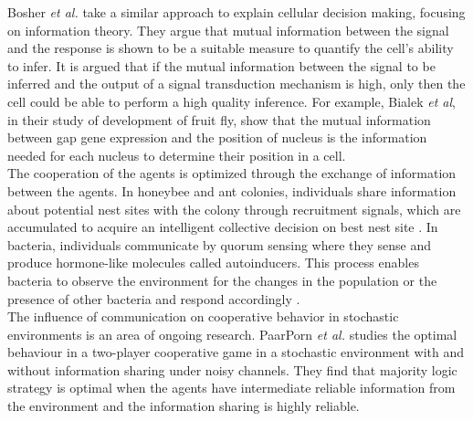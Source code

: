 Bosher \textit{et al.} \cite{Bowsher2014} take a similar approach to explain cellular decision making, focusing on information theory. They argue that mutual information between the signal and the response is shown to be a suitable measure to quantify the cell's ability to infer. It is argued that if the mutual information between the signal to be inferred and the output of a signal transduction mechanism is high, only then the cell could be able to perform a high quality inference. For example, Bialek \textit{et al}, in their study of development of fruit fly, show that the mutual information between gap gene expression and the position of nucleus is the information needed for each nucleus to determine their position in a cell. \\
The cooperation of the agents is optimized through the exchange of information between the agents. In honeybee and ant colonies, individuals share information about potential nest sites with the colony through recruitment signals, which are accumulated to acquire an intelligent collective decision on best nest site \cite{Franks2002}. In bacteria, individuals communicate by quorum sensing where they sense and produce hormone-like molecules called autoinducers. This process enables bacteria to observe the environment for the changes in the population or the presence of other bacteria and respond accordingly \cite{waters2005quorum}.\\
The influence of communication on cooperative behavior in stochastic environments is an area of ongoing research. PaarPorn \textit{et al.} \cite{Paarporn2018a} studies the optimal behaviour in a two-player cooperative game in a stochastic environment with and without information sharing under noisy channels. They find that majority logic strategy is optimal when the agents have intermediate reliable information from the environment and the information sharing is highly reliable.

